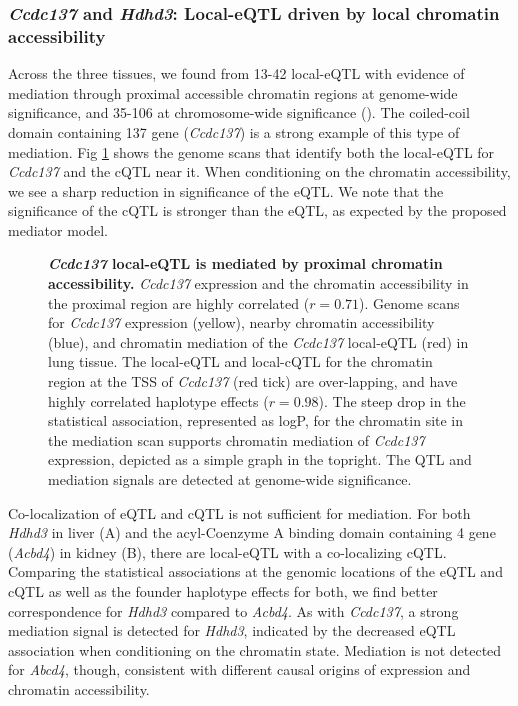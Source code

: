 \documentclass[10pt,letterpaper]{article}
\begin{document}
\subsubsection*{\textit{Ccdc137} and \textit{Hdhd3}: Local-eQTL driven by local chromatin accessibility}
Across the three tissues, we found from 13-42 local-eQTL with evidence of mediation through proximal accessible chromatin regions at genome-wide significance, and 35-106 at chromosome-wide significance (). The coiled-coil domain containing 137 gene (\textit{Ccdc137}) is a strong example of this type of mediation. Fig \ref{fig:ccdc137_mediation} shows the genome scans that identify both the local-eQTL for \textit{Ccdc137} and the cQTL near it. 
When conditioning on the chromatin accessibility, we see a sharp reduction in significance of the eQTL. We note that the significance of the cQTL is stronger than the eQTL, as expected by the proposed mediator model. 

\begin{figure}[h!]
\caption{\textbf{\textit{Ccdc137} local-eQTL is mediated by proximal chromatin accessibility.} \textit{Ccdc137} expression and the chromatin accessibility in the proximal region are highly correlated ($r = 0.71$). Genome scans for \textit{Ccdc137} expression (yellow), nearby chromatin accessibility (blue), and chromatin mediation of the \textit{Ccdc137} local-eQTL (red) in lung tissue. The local-eQTL and local-cQTL for the chromatin region at the TSS of \textit{Ccdc137} (red tick) are over-lapping, and have highly correlated haplotype effects ($r = 0.98$). The steep drop in the statistical association, represented as logP, for the chromatin site in the mediation scan supports chromatin mediation of \textit{Ccdc137} expression, depicted as a simple graph in the topright. The QTL and mediation signals are detected at genome-wide significance. \label{fig:ccdc137_mediation}}
\end{figure}

Co-localization of eQTL and cQTL is not sufficient for mediation. For both \textit{Hdhd3} in liver (A) and the acyl-Coenzyme A binding domain containing 4 gene (\textit{Acbd4}) in kidney (B), there are local-eQTL with a co-localizing cQTL. Comparing the statistical associations at the genomic locations of the eQTL and cQTL as well as the founder haplotype effects for both, we find better correspondence for \textit{Hdhd3} compared to \textit{Acbd4}. As with \textit{Ccdc137}, a strong mediation signal is detected for \textit{Hdhd3}, indicated by the decreased eQTL association when conditioning on the chromatin state. Mediation is not detected for \textit{Abcd4}, though, consistent with different causal origins of expression and chromatin accessibility.
\end{document}
